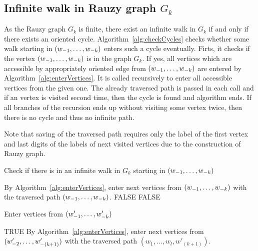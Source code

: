 \subsection*{Infinite walk in Rauzy graph $G_k$}
As the Rauzy graph $G_k$ is finite, there exist an infinite walk in $G_k$ if and only if there exists an oriented cycle. Algorithm~\ref{alg:checkCycles}  checks whether some walk starting in $\tuple{1}{k}$ enters such a cycle eventually. Firts, it  checks if the vertex $\tuple{1}{k}$ is in the graph $G_k$. If yes, all vertices which are accessible by appropriately oriented edge from $\tuple{1}{k}$ are entered by Algorithm~\ref{alg:enterVertices}. It is called recursively to enter all accessible vertices from the given one. The already traversed path is passed in each call and if an vertex is visited second time, then the cycle is found and algorithm ends. If all branches of the recursion ends up without visiting some vertex twice, then there is no cycle and thus no infinite path.

Note that saving of the traversed path requires only the label of the first vertex and last digits of the labels of next visited vertices due to the construction of Rauzy graph.
\begin{algorithm}
  \caption{Check if there is in an infinite walk in $G_k$ starting in $\tuple{1}{k}$}
    \label{alg:checkCycles}
  \begin{algorithmic}[1]
		\STATE By Algorithm~\ref{alg:enterVertices}, enter next vertices from $\tuple{1}{k}$ with the traversed path  $\tuple{1}{k}$.
	\ELSE
		\RETURN FALSE
	\ENDIF
	\RETURN FALSE
  \end{algorithmic}
\end{algorithm}

\begin{algorithm}
  \caption{Enter vertices from $\tuple[w']{1}{k}$}
    \label{alg:enterVertices}
  \begin{algorithmic}[1]
			\RETURN TRUE
		\ELSE
			\STATE By Algorithm~\ref{alg:enterVertices}, enter next vertices from $\tuple[w']{2}{(k+1)}$ with the traversed path   $(w_1, \dots, w_l, w'_{(k+1)})$.
		\ENDIF
	\ENDFOR
  \end{algorithmic}
\end{algorithm}


